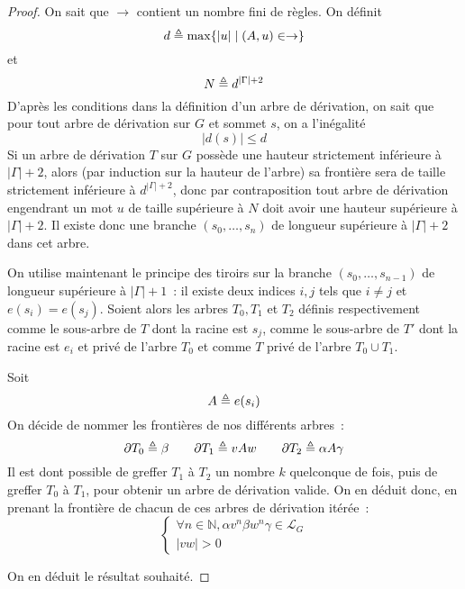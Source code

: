 \begin{proof}
  On sait que $\to$ contient un nombre fini de règles. On définit
  \[d \triangleq \max \{|u| \mid (A,u) \in \to\}\]
  et
  \[N \triangleq d^{|\Gamma|+2}\]
  D'après les conditions dans la définition d'un arbre de dérivation, on sait
  que pour tout arbre de dérivation sur $G$ et sommet $s$, on a l'inégalité
  \[|d(s)| \leq d\]
  Si un arbre de dérivation $T$ sur $G$ possède une hauteur strictement
  inférieure à $|\Gamma| + 2$, alors (par induction sur la hauteur de l'arbre)
  sa frontière sera de taille strictement inférieure à $d^{|\Gamma| + 2}$, donc
  par contraposition tout arbre de dérivation engendrant un mot $u$ de taille
  supérieure à $N$ doit avoir une hauteur supérieure à $|\Gamma| + 2$. Il existe
  donc une branche $(s_0,\ldots,s_n)$ de longueur supérieure à $|\Gamma| + 2$
  dans cet arbre.

  On utilise maintenant le principe des tiroirs sur la branche
  $(s_0,\ldots,s_{n-1})$ de longueur supérieure à $|\Gamma| + 1$~: il existe
  deux indices $i,j$ tels que $i\neq j$ et $e(s_i) = e(s_j)$. Soient alors les
  arbres $T_0,T_1$ et $T_2$ définis respectivement comme le sous-arbre de $T$
  dont la racine est $s_j$, comme le sous-arbre de $T'$ dont la racine est $e_i$
  et privé de l'arbre $T_0$ et comme $T$ privé de l'arbre $T_0\cup T_1$.

  Soit
  \[A \triangleq e(s_i)\]
  On décide de nommer les frontières de nos différents arbres~:
  \[\partial T_0 \triangleq \beta \qquad \partial T_1 \triangleq vAw \qquad
  \partial T_2 \triangleq \alpha A \gamma\]
  Il est dont possible de greffer $T_1$ à $T_2$ un nombre $k$ quelconque de
  fois, puis de greffer $T_0$ à $T_1$, pour obtenir un arbre de dérivation
  valide. On en déduit donc, en prenant la frontière de chacun de ces arbres de
  dérivation itérée~:
  \[\begin{cases}
  \forall n \in \mathbb N, \alpha v^n \beta w^n \gamma \in \mathcal L_G\\
  |vw| > 0
  \end{cases}\]

  On en déduit le résultat souhaité.
\end{proof}

